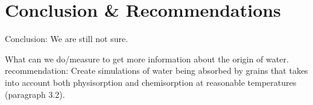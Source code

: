 
\section{\label{chap:conclusion}Conclusion \& Recommendations}
Conclusion: We are still not sure.

What can we do/measure to get more information about the origin of water.\\

recommendation: Create simulations of water being absorbed by grains that takes into account both physisorption and chemisorption at reasonable temperatures (paragraph 3.2).\\